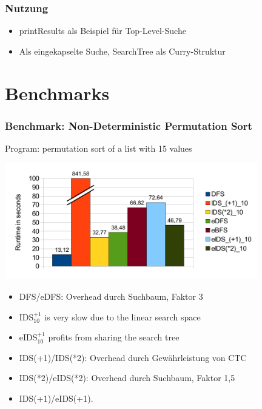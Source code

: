 \documentclass[
,hyperref={pdfpagelabels=false}
]{beamer}
\newcommand{\todo}[1]{\fbox{\sc To do: #1}}
\begin{document}
\begin{frame}[fragile]%
\frametitle{Nutzung}
\begin{itemize}
\item printResults als Beispiel für Top-Level-Suche
\item Als eingekapselte Suche, SearchTree als Curry-Struktur
\end{itemize}
\end{frame}

\section{Benchmarks}

\begin{frame}%
\frametitle{Benchmark: Non-Deterministic Permutation Sort}
Program: permutation sort of a list with 15 values
\begin{center}
\includegraphics[width=11cm]{gfx/permsort}
\end{center}
\begin{itemize}
\item DFS/eDFS: Overhead durch Suchbaum, Faktor 3
\item $\text{IDS}_{10}^{+1}$ is very slow due to the linear search space
\item $\text{eIDS}_{10}^{+1}$ profits from sharing the search tree
\item IDS(+1)/IDS(*2): Overhead durch Gewährleistung von CTC
\item IDS(*2)/eIDS(*2): Overhead durch Suchbaum, Faktor 1,5
\item IDS(+1)/eIDS(+1). \todo{Aussage}
\end{itemize}
\end{frame}
\end{document}
